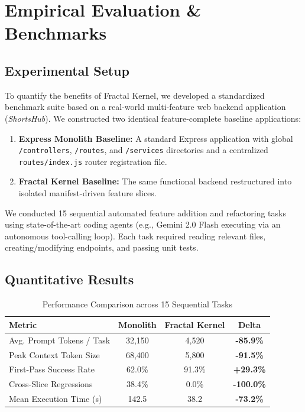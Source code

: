 \documentclass[conference]{IEEEtran}
\begin{document}
\section{Empirical Evaluation \& Benchmarks}

\subsection{Experimental Setup}
To quantify the benefits of Fractal Kernel, we developed a standardized benchmark suite based on a real-world multi-feature web backend application (\textit{ShortsHub}). We constructed two identical feature-complete baseline applications:
\begin{enumerate}
    \item \textbf{Express Monolith Baseline:} A standard Express application with global \texttt{/controllers}, \texttt{/routes}, and \texttt{/services} directories and a centralized \texttt{routes/index.js} router registration file.
    \item \textbf{Fractal Kernel Baseline:} The same functional backend restructured into isolated manifest-driven feature slices.
\end{enumerate}

We conducted 15 sequential automated feature addition and refactoring tasks using state-of-the-art coding agents (e.g., Gemini 2.0 Flash executing via an autonomous tool-calling loop). Each task required reading relevant files, creating/modifying endpoints, and passing unit tests.

\subsection{Quantitative Results}

\begin{table}[htbp]
\caption{Performance Comparison across 15 Sequential Tasks}
\label{tab:benchmark_results}
\centering
\setlength{\tabcolsep}{2.5pt}
\footnotesize
\begin{tabular}{lccc}
\toprule
\textbf{Metric} & \textbf{Monolith} & \textbf{Fractal Kernel} & \textbf{Delta} \\
\midrule
Avg. Prompt Tokens / Task & 32,150 & 4,520 & \textbf{-85.9\%} \\
Peak Context Token Size & 68,400 & 5,800 & \textbf{-91.5\%} \\
First-Pass Success Rate & 62.0\% & 91.3\% & \textbf{+29.3\%} \\
Cross-Slice Regressions & 38.4\% & 0.0\% & \textbf{-100.0\%} \\
Mean Execution Time (s) & 142.5 & 38.2 & \textbf{-73.2\%} \\
\bottomrule
\end{tabular}
\end{table}
\end{document}
